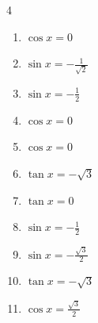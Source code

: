 \begin{multicols}{4}
\begin{enumerate}
  \item $\displaystyle \cos{x}  = 0$


  \item $\displaystyle \sin{x}  = -\frac{1}{\sqrt{2}}$


\columnbreak %

\resetques

  \item $\displaystyle \sin{x}  = -\frac{1}{2}$


  \item $\displaystyle \cos{x}  = 0$


  \item $\displaystyle \cos{x}  = 0$


  \item $\displaystyle \tan{x}  = -\sqrt{3}$


  \item $\displaystyle \tan{x}  = 0$

        \phantom{$\displaystyle x = 0 , \pi$}

  \item $\displaystyle \sin{x}  = -\frac{1}{2}$


  \item $\displaystyle \sin{x}  = -\frac{\sqrt{3}}{2}$


  \item $\displaystyle \tan{x}  = -\sqrt{3}$


  \item $\displaystyle \cos{x}  = \frac{\sqrt{3}}{2}$



\end{enumerate}
\end{multicols}
